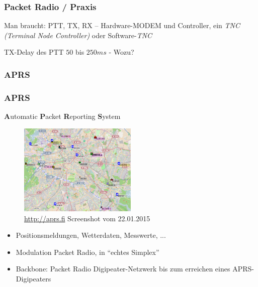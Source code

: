 \begin{frame}
  \frametitle{Packet Radio / Praxis}

  Man braucht: PTT, TX, RX -- Hardware-MODEM und Controller, ein \emph{TNC
  (Terminal Node Controller)} oder Software-\emph{TNC} \\[2em]


  \begin{block}{TX-Delay des PTT $50$ bis $250ms$ - Wozu?}
  \end{block}

\end{frame}

\subsubsection{APRS}

\begin{frame}
  \frametitle{APRS}

  \textbf{A}utomatic \textbf{P}acket \textbf{R}eporting \textbf{S}ystem

  \begin{center}
    \begin{figure}
      \includegraphics[width=0.5\textwidth,height=.4\textheight,keepaspectratio]{e16/APRS.png}
      \caption{\ExternalLink\url{http://aprs.fi} Screenshot vom 22.01.2015}
    \end{figure}
  \end{center}

  \begin{itemize}
    \item Positionsmeldungen, Wetterdaten, Messwerte, ...
    \item Modulation Packet Radio, in ``echtes Simplex''
    \item Backbone: Packet Radio Digipeater-Netzwerk bis zum erreichen eines
      APRS-Digipeaters
  \end{itemize}

\end{frame}

